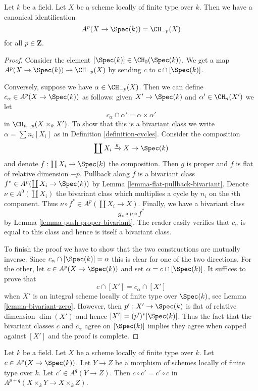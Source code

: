 \begin{lemma}
\label{lemma-chow-cohomology-towards-point}
Let $k$ be a field. Let $X$ be a scheme locally of finite type over $k$.
Then we have a canonical identification
$$
A^p(X \to \Spec(k)) = \CH_{-p}(X)
$$
for all $p \in \mathbf{Z}$.
\end{lemma}

\begin{proof}
Consider the element $[\Spec(k)] \in \CH_0(\Spec(k))$. We get a map
$A^p(X \to \Spec(k)) \to \CH_{-p}(X)$ by sending $c$ to $c \cap [\Spec(k)]$.

\medskip\noindent
Conversely, suppose we have $\alpha \in \CH_{-p}(X)$.
Then we can define $c_\alpha \in A^p(X \to \Spec(k))$ as
follows: given $X' \to \Spec(k)$ and $\alpha' \in \CH_n(X')$
we let
$$
c_\alpha \cap \alpha' = \alpha \times \alpha'
$$
in $\CH_{n - p}(X \times_k X')$. To show that this is a bivariant
class we write $\alpha = \sum n_i[X_i]$ as in
Definition \ref{definition-cycles}. Consider the composition
$$
\coprod X_i \xrightarrow{g} X \to \Spec(k)
$$
and denote $f : \coprod X_i \to \Spec(k)$ the composition.
Then $g$ is proper and $f$ is flat of relative dimension $-p$.
Pullback along $f$ is a bivariant class
$f^* \in A^p(\coprod X_i \to \Spec(k))$ by
Lemma \ref{lemma-flat-pullback-bivariant}.
Denote $\nu \in A^0(\coprod X_i)$ the bivariant class
which multiplies a cycle by $n_i$ on the $i$th component.
Thus $\nu \circ f^* \in A^p(\coprod X_i \to X)$.
Finally, we have a bivariant class
$$
g_* \circ \nu \circ f^*
$$
by Lemma \ref{lemma-push-proper-bivariant}. The reader easily
verifies that $c_\alpha$ is equal to this class and hence
is itself a bivariant class.

\medskip\noindent
To finish the proof we have to show that the two constructions
are mutually inverse. Since $c_\alpha \cap [\Spec(k)] = \alpha$
this is clear for one of the two directions. For the other, let
$c \in A^p(X \to \Spec(k))$ and set $\alpha = c \cap [\Spec(k)]$.
It suffices to prove that
$$
c \cap [X'] = c_\alpha \cap [X']
$$
when $X'$ is an integral scheme locally of finite type over $\Spec(k)$,
see Lemma \ref{lemma-bivariant-zero}. However, then $p' : X' \to \Spec(k)$
is flat of relative dimension $\dim(X')$ and hence
$[X'] = (p')^*[\Spec(k)]$. Thus the fact that the bivariant classes
$c$ and $c_\alpha$ agree on $[\Spec(k)]$ implies they
agree when capped against $[X']$ and the proof is complete.
\end{proof}

\begin{lemma}
\label{lemma-chow-cohomology-towards-point-commutes}
Let $k$ be a field. Let $X$ be a scheme locally of finite type over $k$.
Let $c \in A^p(X \to \Spec(k))$. Let $Y \to Z$ be a morphism of schemes
locally of finite type over $k$. Let $c' \in A^q(Y \to Z)$. Then
$c \circ c' = c' \circ c$ in $A^{p + q}(X \times_k Y \to X \times_k Z)$.
\end{lemma}

